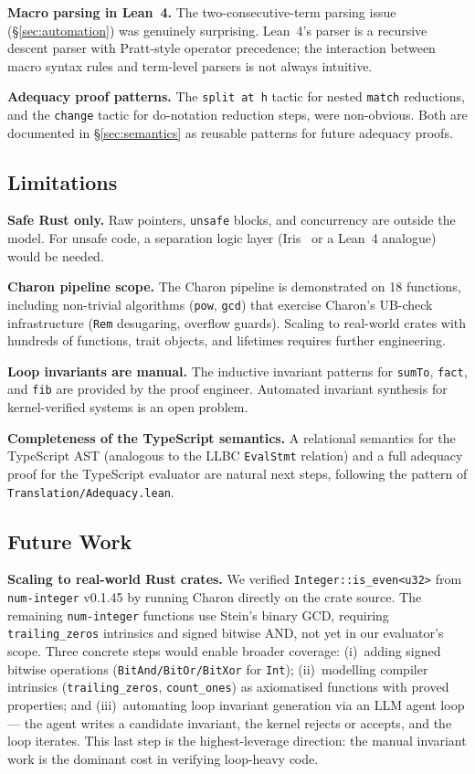 \textbf{Macro parsing in Lean~4.} The two-consecutive-term parsing issue
(\S\ref{sec:automation}) was genuinely surprising. Lean~4's parser is a
recursive descent parser with Pratt-style operator precedence; the interaction
between macro syntax rules and term-level parsers is not always intuitive.

\textbf{Adequacy proof patterns.} The \texttt{split at h} tactic for nested
\texttt{match} reductions, and the \texttt{change} tactic for do-notation
reduction steps, were non-obvious. Both are documented in
\S\ref{sec:semantics} as reusable patterns for future adequacy proofs.

\subsection{Limitations}

\textbf{Safe Rust only.} Raw pointers, \texttt{unsafe} blocks, and
concurrency are outside the model. For unsafe code, a separation logic
layer (Iris~\cite{iris2015} or a Lean~4 analogue) would be needed.

\textbf{Charon pipeline scope.} The Charon pipeline is demonstrated on
18 functions, including non-trivial algorithms (\texttt{pow}, \texttt{gcd})
that exercise Charon's UB-check infrastructure (\texttt{Rem} desugaring,
overflow guards). Scaling to real-world crates with hundreds of
functions, trait objects, and lifetimes requires further engineering.

\textbf{Loop invariants are manual.} The inductive invariant patterns for
\texttt{sumTo}, \texttt{fact}, and \texttt{fib} are provided by the proof
engineer. Automated invariant synthesis for kernel-verified systems is an
open problem.

\textbf{Completeness of the TypeScript semantics.} A relational semantics
for the TypeScript AST (analogous to the LLBC \texttt{EvalStmt} relation)
and a full adequacy proof for the TypeScript evaluator are natural next steps,
following the pattern of \texttt{Translation/Adequacy.lean}.

\subsection{Future Work}

\textbf{Scaling to real-world Rust crates.} We verified \texttt{Integer::is\_even<u32>}
from \texttt{num-integer} v0.1.45 by running Charon directly on the crate source.
The remaining \texttt{num-integer} functions use Stein's binary GCD, requiring
\texttt{trailing\_zeros} intrinsics and signed bitwise AND, not yet in our
evaluator's scope. Three concrete steps would enable broader coverage:
(i)~adding signed bitwise operations (\texttt{BitAnd/BitOr/BitXor} for \texttt{Int});
(ii)~modelling compiler intrinsics (\texttt{trailing\_zeros}, \texttt{count\_ones})
as axiomatised functions with proved properties; and
(iii)~automating loop invariant generation via an LLM agent loop —
the agent writes a candidate invariant, the kernel rejects or accepts, and the
loop iterates. This last step is the highest-leverage direction: the manual
invariant work is the dominant cost in verifying loop-heavy code.

